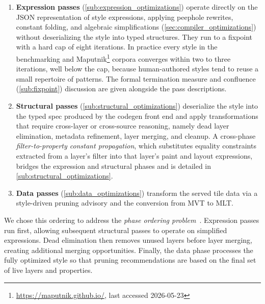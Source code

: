 \begin{enumerate}
    \item \textbf{Expression passes} (\cref{sub:expression_optimizations}) operate directly on the \ac{JSON} representation of style expressions, applying peephole rewrites, constant folding, and algebraic simplifications (\cref{sec:compiler_optimizations}) without deserializing the style into typed structures.
    They run to a fixpoint with a hard cap of eight iterations.
    In practice every style in the benchmarking and Maputnik\footnote{\url{https://maputnik.github.io/}, last accessed 2026-05-23} corpora converges within two to three iterations, well below the cap, because human-authored styles tend to reuse a small repertoire of patterns.
    The formal termination measure and confluence (\cref{sub:fixpoint}) discussion are given alongside the pass descriptions.
    \item \textbf{Structural passes} (\cref{sub:structural_optimizations}) deserialize the style into the typed spec produced by the codegen front end and apply transformations that require cross-layer or cross-source reasoning, namely dead layer elimination, metadata refinement, layer merging, and cleanup.
    A cross-phase \emph{filter-to-property constant propagation}, which substitutes equality constraints extracted from a layer's filter into that layer's paint and layout expressions, bridges the expression and structural phases and is detailed in \cref{sub:structural_optimizations}.
    \item \textbf{Data passes} (\cref{sub:data_optimizations}) transform the served tile data via a style-driven pruning advisory and the conversion from \ac{MVT} to \ac{MLT}.
\end{enumerate}

\noindent We chose this ordering to address the \emph{phase ordering problem}~\cite{clickCombiningAnalysesCombining1995}.
Expression passes run first, allowing subsequent structural passes to operate on simplified expressions.
Dead elimination then removes unused layers before layer merging, creating additional merging opportunities.
Finally, the data phase processes the fully optimized style so that pruning recommendations are based on the final set of live layers and properties.

